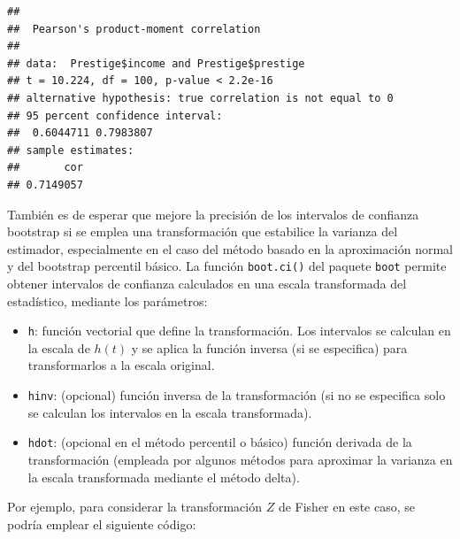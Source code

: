 \documentclass[
]{book}
\theoremstyle{break}
\theoremstyle{nonumberplain}
\begin{document}
\begin{verbatim}
## 
##  Pearson's product-moment correlation
## 
## data:  Prestige$income and Prestige$prestige
## t = 10.224, df = 100, p-value < 2.2e-16
## alternative hypothesis: true correlation is not equal to 0
## 95 percent confidence interval:
##  0.6044711 0.7983807
## sample estimates:
##       cor 
## 0.7149057
\end{verbatim}

También es de esperar que mejore la precisión de los intervalos de confianza bootstrap si se emplea una transformación que estabilice la varianza del estimador, especialmente en el caso del método basado en la aproximación normal y del bootstrap percentil básico.
La función \texttt{boot.ci()} del paquete \texttt{boot} permite obtener intervalos de confianza calculados en una escala transformada del estadístico, mediante los parámetros:

\begin{itemize}
\item
  \texttt{h}: función vectorial que define la transformación.
  Los intervalos se calculan en la escala de \(h(t)\) y se aplica la función inversa (si se especifica) para transformarlos a la escala original.
\item
  \texttt{hinv}: (opcional) función inversa de la transformación
  (si no se especifica solo se calculan los intervalos en la escala transformada).
\item
  \texttt{hdot}: (opcional en el método percentil o básico) función derivada de la transformación
  (empleada por algunos métodos para aproximar la varianza en la escala transformada mediante el método delta).
\end{itemize}

Por ejemplo, para considerar la transformación \(Z\) de Fisher en este caso, se podría emplear el siguiente código:
\end{document}

